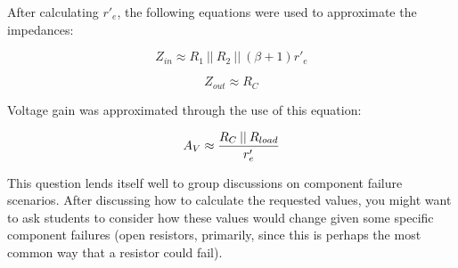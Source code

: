 \goodbreak

After calculating $r'_e$, the following equations were used to approximate the impedances:

$$Z_{in} \approx R_1 \> || \> R_2 \> || \> (\beta + 1)r'_e$$

$$Z_{out} \approx R_C$$

Voltage gain was approximated through the use of this equation:

$$A_V \approx {R_C \> || \> R_{load} \over r'_e}$$

This question lends itself well to group discussions on component failure scenarios.  After discussing how to calculate the requested values, you might want to ask students to consider how these values would change given some specific component failures (open resistors, primarily, since this is perhaps the most common way that a resistor could fail).





